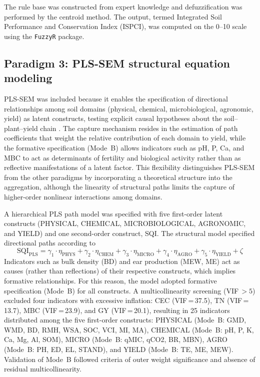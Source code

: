 \documentclass[pdflatex,sn-basic]{sn-jnl}%
\begin{document}
The rule base was constructed from expert knowledge and defuzzification was performed by the centroid method. The output, termed Integrated Soil Performance and Conservation Index (ISPCI), was computed on the 0--10 scale using the \texttt{FuzzyR} package.

\subsection{Paradigm 3: PLS-SEM structural equation modeling}\label{subsec:sem}

PLS-SEM was included because it enables the specification of directional relationships among soil domains (physical, chemical, microbiological, agronomic, yield) as latent constructs, testing explicit causal hypotheses about the soil--plant--yield chain \citep{Hair2019,Sarstedt2022}. The capture mechanism resides in the estimation of path coefficients that weight the relative contribution of each domain to yield, while the formative specification (Mode~B) allows indicators such as pH, P, Ca, and MBC to act as determinants of fertility and biological activity rather than as reflective manifestations of a latent factor. This flexibility distinguishes PLS-SEM from the other paradigms by incorporating a theoretical structure into the aggregation, although the linearity of structural paths limits the capture of higher-order nonlinear interactions among domains.

A hierarchical PLS path model was specified with five first-order latent constructs (PHYSICAL, CHEMICAL, MICROBIOLOGICAL, AGRONOMIC, and YIELD) and one second-order construct, SQI. The structural model specified directional paths according to
\begin{equation}
\text{SQI}_{\text{PLS}} = \gamma_1 \cdot \eta_{\text{PHYS}} + \gamma_2 \cdot \eta_{\text{CHEM}} + \gamma_3 \cdot \eta_{\text{MICRO}} + \gamma_4 \cdot \eta_{\text{AGRO}} + \gamma_5 \cdot \eta_{\text{YIELD}} + \zeta
\label{eq:plssem}
\end{equation}
Indicators such as bulk density (BD) and ear production (MEW, ME) act as causes (rather than reflections) of their respective constructs, which implies formative relationships. For this reason, the model adopted formative specification (Mode~B) for all constructs. A multicollinearity screening (VIF\,$> 5$) excluded four indicators with excessive inflation: CEC (VIF\,=\,37.5), TN (VIF\,=\,13.7), MBC (VIF\,=\,23.9), and GY (VIF\,=\,20.1), resulting in 25 indicators distributed among the five first-order constructs: PHYSICAL (Mode~B: GMD, WMD, BD, RMH, WSA, SOC, VCI, MI, MA), CHEMICAL (Mode~B: pH, P, K, Ca, Mg, Al, SOM), MICRO (Mode~B: qMIC, qCO2, BR, MBN), AGRO (Mode~B: PH, ED, EL, STAND), and YIELD (Mode~B: TE, ME, MEW). Validation of Mode~B followed criteria of outer weight significance and absence of residual multicollinearity.
\end{document}
